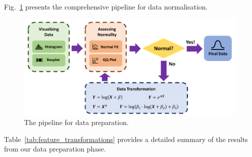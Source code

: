 \documentclass{article}
\begin{document}
	Fig.~\ref{data_prep} presents the comprehensive pipeline for data normalisation.
	\begin{figure}
		\centering
		\includegraphics[width=\textwidth]{graphs/prepare_data.pdf}
		\caption{The pipeline for data preparation.}
		\label{data_prep}
	\end{figure}
	
	Table~\ref{tab:feature_transformations} provides a detailed summary of the results from our data preparation phase.
	
\end{document}
